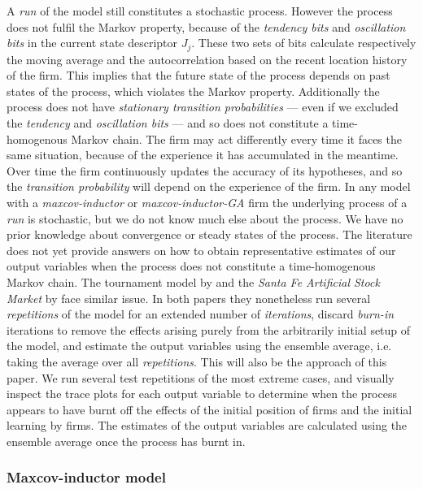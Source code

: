 \documentclass[preprint, 12pt]{elsarticle}
\begin{document}
A \emph{run} of the model still constitutes a stochastic process. However the process does not fulfil the Markov property, because of the \emph{tendency bits} and \emph{oscillation bits} in the current state descriptor $J_j$. These two sets of bits calculate respectively the moving average and the autocorrelation based on the recent location history of the firm. This implies that the future state of the process depends on past states of the process, which violates the Markov property. Additionally the process does not have \emph{stationary transition probabilities} — even if we excluded the \emph{tendency} and \emph{oscillation bits} — and so does not constitute a time-homogenous Markov chain. The firm may act differently every time it faces the same situation, because of the experience it has accumulated in the meantime. Over time the firm continuously updates the accuracy of its hypotheses, and so the \emph{transition probability} will depend on the experience of the firm. In any model with a \emph{maxcov-inductor} or \emph{maxcov-inductor-GA} firm the underlying process of a \emph{run} is stochastic, but we do not know much else about the process. We have no prior knowledge about convergence or steady states of the process. The literature does not yet provide answers on how to obtain representative estimates of our output variables when the process does not constitute a time-homogenous Markov chain. The tournament model by \citet{Fowler_Laver_2008} and the \emph{Santa Fe Artificial Stock Market} by \citet[chapter~3]{Arthur_2014} face similar issue. In both papers they nonetheless run several \emph{repetitions} of the model for an extended number of \emph{iterations}, discard \emph{burn-in} iterations to remove the effects arising purely from the arbitrarily initial setup of the model, and estimate the output variables using the ensemble average, i.e. taking the average over all \emph{repetitions}. This will also be the approach of this paper. We run several test repetitions of the most extreme cases, and visually inspect the trace plots for each output variable to determine when the process appears to have burnt off the effects of the initial position of firms and the initial learning by firms. The estimates of the output variables are calculated using the ensemble average once the process has burnt in.

\subsubsection{Maxcov-inductor model}
\end{document}
